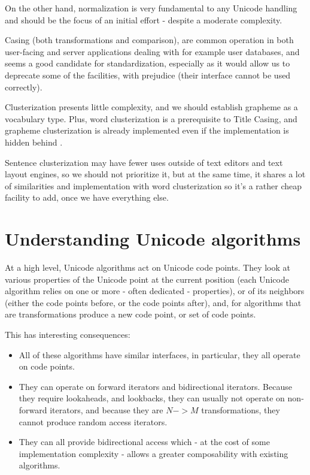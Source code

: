 \documentclass{wg21}
\begin{document}
On the other hand, normalization is very fundamental to any Unicode handling and should be the focus of an initial effort - despite a moderate complexity.

Casing (both transformations and comparison), are common operation in both user-facing and server applications dealing with for example user databases, and seems a good candidate for standardization, especially as it would allow us to deprecate some of the  facilities, with prejudice (their interface cannot be used correctly).

Clusterization presents little complexity, and we should establish grapheme as a vocabulary type. Plus, word clusterization is a prerequisite to Title Casing, and grapheme clusterization is already implemented even if the implementation is hidden behind .

Sentence clusterization may have fewer uses outside of text editors and text layout engines, so we should not prioritize it, but at the same time, it shares a lot of similarities and implementation with word clusterization so it's a rather cheap facility to add, once we have everything else.

\section{Understanding Unicode algorithms}

At a high level, Unicode algorithms act on Unicode code points.
They look at various properties of the Unicode point at the current position (each Unicode algorithm relies on one or more - often dedicated - properties), or of its neighbors (either the code points before, or the code points after), and, for algorithms that are transformations produce a new code point, or set of code points.

This has interesting consequences:
\begin{itemize}
\item All of these algorithms have similar interfaces, in particular, they all operate on code points.
\item They can operate on forward iterators and bidirectional iterators. Because they require lookaheads, and lookbacks, they can usually not operate on non-forward iterators, and because they are $N->M$ transformations, they cannot produce random access iterators.
\item They can all provide bidirectional access which - at the cost of some implementation complexity - allows a greater composability with existing algorithms.
\end{itemize}
\end{document}
